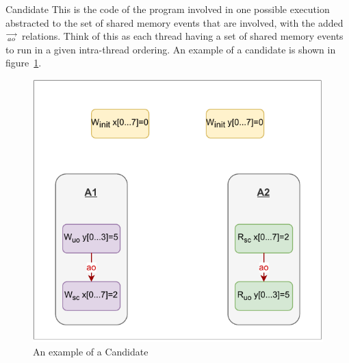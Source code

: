     \begin{definition}{Candidate}
        This is the code of the program involved in one possible execution abstracted to the set of shared memory events that are involved, with the added $\stackrel{\longrightarrow}{_{ao}}$ relations. Think of this as each thread having a set of shared memory events to run in a given intra-thread ordering. An example of a candidate is shown in figure~\ref{fig:candidate}.
        
    
        \begin{figure}[H]
            \centering
            \includegraphics[scale=0.7]{Candidate.pdf}
            \caption{An example of a Candidate}
            \label{fig:candidate}
        \end{figure}
        
    \end{definition}
    
    

